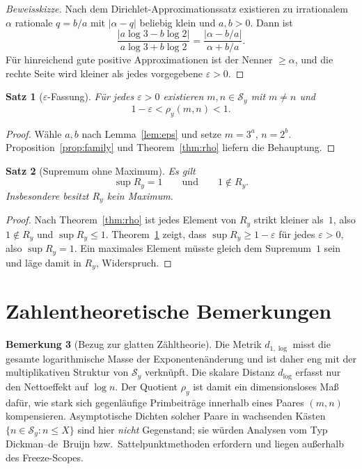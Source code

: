 \documentclass[11pt,a4paper]{article}
\newtheorem{theorem}{Satz}
\theoremstyle{definition}
\newtheorem{remark}[theorem]{Bemerkung}
\newcommand{\Sy}{\mathcal{S}_y}
\newcommand{\dlog}{d_{\log}}
\newcommand{\dlogone}{d_{1,\log}}
\newcommand{\rhoy}{\rho_y}
\newcommand{\Ry}{R_y}
\begin{document}
	\begin{proof}[Beweisskizze]
		Nach dem Dirichlet-Approximationssatz
		\cite{cassels1957}
		existieren zu irrationalem $\alpha$ rationale $q=b/a$ mit
		$\lvert\alpha-q\rvert$ beliebig klein und $a,b>0$.
		Dann ist
		\[
		\frac{\lvert a\log 3-b\log 2\rvert}{a\log 3+b\log 2}
		=
		\frac{\lvert\alpha-b/a\rvert}{\alpha+b/a}.
		\]
		F{\"u}r hinreichend gute positive Approximationen ist der Nenner
		$\ge\alpha$, und die rechte Seite wird kleiner als jedes vorgegebene
		$\varepsilon>0$.
	\end{proof}
	
	\begin{theorem}[$\varepsilon$-Fassung]
		\label{thm:eps}
		F{\"u}r jedes $\varepsilon>0$ existieren $m,n\in\Sy$ mit $m\neq n$ und
		\[
		1-\varepsilon<\rhoy(m,n)<1.
		\]
	\end{theorem}
	
	\begin{proof}
		W{\"a}hle $a,b$ nach Lemma~\ref{lem:eps} und setze $m=3^a$, $n=2^b$.
		Proposition~\ref{prop:family} und Theorem~\ref{thm:rho} liefern die
		Behauptung.
	\end{proof}
	
	\begin{theorem}[Supremum ohne Maximum]
		\label{thm:sup}
		Es gilt
		\[
		\sup\Ry=1
		\qquad\text{und}\qquad
		1\notin\Ry.
		\]
		Insbesondere besitzt $\Ry$ kein Maximum.
	\end{theorem}
	
	\begin{proof}
		Nach Theorem~\ref{thm:rho} ist jedes Element von $\Ry$ strikt kleiner
		als~$1$, also $1\notin\Ry$ und $\sup\Ry\le 1$.
		Theorem~\ref{thm:eps} zeigt, dass $\sup\Ry\ge 1-\varepsilon$ f{\"u}r jedes
		$\varepsilon>0$, also $\sup\Ry=1$.
		Ein maximales Element m{\"u}sste gleich dem Supremum~$1$ sein und l{\"a}ge
		damit in $\Ry$, Widerspruch.
	\end{proof}
	
	\section{Zahlentheoretische Bemerkungen}
	\label{sec:remarks}
	
	\begin{remark}[Bezug zur glatten Z{\"a}hltheorie]
		Die Metrik $\dlogone$ misst die gesamte logarithmische Masse der
		Exponenten{\"a}nderung und ist daher eng mit der multiplikativen Struktur
		von $\Sy$ verkn{\"u}pft.
		Die skalare Distanz $\dlog$ erfasst nur den Nettoeffekt auf $\log n$.
		Der Quotient $\rhoy$ ist damit ein dimensionsloses Ma{\ss} daf{\"u}r, wie stark
		sich gegenl{\"a}ufige Primbeitr{\"a}ge innerhalb eines Paares $(m,n)$
		kompensieren.
		Asymptotische Dichten solcher Paare in wachsenden K{\"a}sten
		$\{n\in\Sy:n\le X\}$ sind hier \emph{nicht} Gegenstand; sie w{\"u}rden
		Analysen vom Typ Dickman--de~Bruijn bzw.\ Sattelpunktmethoden erfordern
		\cite{hildebrand-tenenbaum1993} und liegen au{\ss}erhalb des Freeze-Scopes.
	\end{remark}
	
\end{document}

